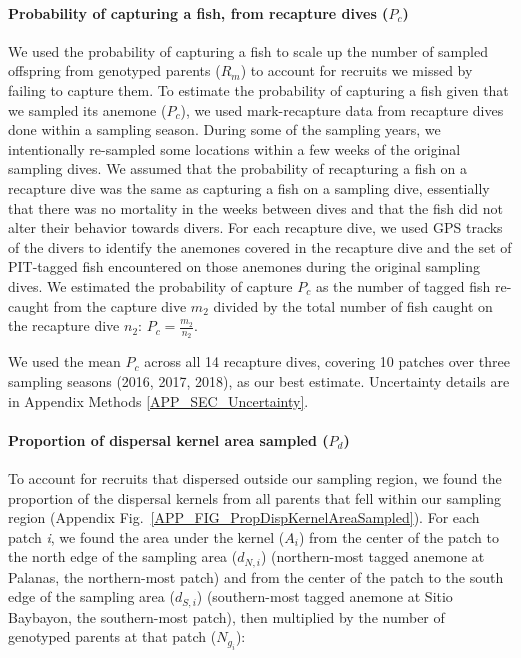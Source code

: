 \documentclass[12pt, oneside]{article}   	%
\begin{document}
\paragraph*{Probability of capturing a fish, from recapture dives ($P_c$)} 

We used the probability of capturing a fish to scale up the number of sampled offspring from genotyped parents ($R_m$) to account for recruits we missed by failing to capture them. To estimate the probability of capturing a fish given that we sampled its anemone ($P_c$), we used mark-recapture data from recapture dives done within a sampling season. During some of the sampling years, we intentionally re-sampled some locations within a few weeks of the original sampling dives. We assumed that the probability of recapturing a fish on a recapture dive was the same as capturing a fish on a sampling dive, essentially that there was no mortality in the weeks between dives and that the fish did not alter their behavior towards divers. For each recapture dive, we used GPS tracks of the divers to identify the anemones covered in the recapture dive and the set of PIT-tagged fish encountered on those anemones during the original sampling dives. We estimated the probability of capture $P_c$ as the number of tagged fish re-caught from the capture dive $m_2$ divided by the total number of fish caught on the recapture dive $n_2$: $P_c = \frac{m_2}{n_2}$. 

We used the mean $P_c$ across all 14 recapture dives, covering 10 patches over three sampling seasons (2016, 2017, 2018), as our best estimate. Uncertainty details are in Appendix Methods \ref{APP_SEC_Uncertainty}.

\paragraph*{Proportion of dispersal kernel area sampled ($P_d$)} 

To account for recruits that dispersed outside our sampling region, we found the proportion of the dispersal kernels from all parents that fell within our sampling region (Appendix Fig.\ \ref{APP_FIG_PropDispKernelAreaSampled}). For each patch \textit{i}, we found the area under the kernel ($A_i$) from the center of the patch to the north edge of the sampling area ($d_{N,i}$) (northern-most tagged anemone at Palanas, the northern-most patch) and from the center of the patch to the south edge of the sampling area ($d_{S,i}$) (southern-most tagged anemone at Sitio Baybayon, the southern-most patch), then multiplied by the number of genotyped parents at that patch ($N_{g_i}$):
\end{document}
